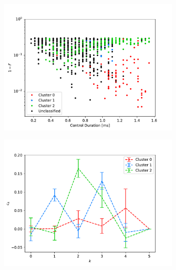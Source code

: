 \documentclass[a4paper, twocolumn]{revtex4-1}
\begin{document}
\begin{figure}
	\begin{subfigure}{\columnwidth}
		\centering
		\includegraphics[width=\columnwidth]{graphics/qengine/QEclustering-classification.pdf}
	\end{subfigure}
	\begin{subfigure}{\columnwidth}
		\centering
		\includegraphics[width=\columnwidth]{graphics/qengine/QEclustering-features.pdf}
	\end{subfigure}
	\begin{subfigure}{\columnwidth}
		\centering

\end{subfigure}
\end{figure}
\end{document}
